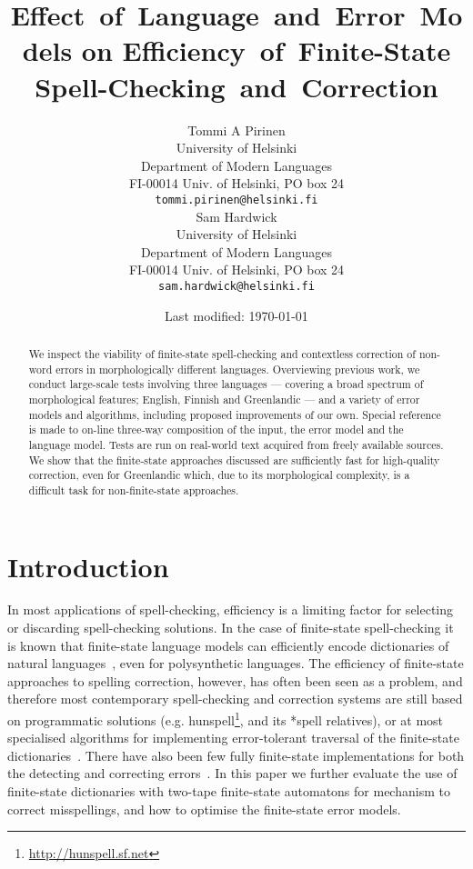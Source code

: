 \documentclass[free]{flammie}
\title{Effect~of~Language~and~Error~Models on Efficiency~of~Finite-State
Spell-Checking~and~Correction\footnotepubrights{Originally published in
FSMNLP 2012 in Donostia. Official version available from ACL anthology:
\url{http://aclweb.org/anthology//sigfsm.html}}}
\author{
Tommi A Pirinen\\
University of Helsinki\\
Department of Modern Languages\\
FI-00014 Univ. of Helsinki, PO box 24\\
{\tt tommi.pirinen@helsinki.fi} \\
Sam Hardwick\\
University of Helsinki\\
Department of Modern Languages\\
FI-00014 Univ. of Helsinki, PO box 24\\
{\tt sam.hardwick@helsinki.fi} \\
}
\date{Last modified: \today}
\begin{document}
\maketitle 

\begin{abstract} We inspect the viability of finite-state
spell-checking and contextless correction of non-word errors in morphologically
different languages. Overviewing previous
work, we conduct large-scale tests involving three languages
--- covering a broad spectrum of morphological features;
English, Finnish and Greenlandic --- and a variety of
error models and algorithms, including proposed
improvements of our own. Special reference is made to on-line
three-way composition of the input, the error model and the language model.
Tests are run on real-world text acquired from
freely available sources.
We show that the finite-state approaches discussed are sufficiently fast
for high-quality correction, even for Greenlandic which, due to its morphological
complexity, is a difficult task for non-finite-state approaches.
\end{abstract}

\section{Introduction}
\label{sec:introduction}

In most applications of spell-checking, efficiency is a limiting
factor for selecting or discarding spell-checking solutions. In the case of
finite-state spell-checking it is known that finite-state language models can
efficiently encode dictionaries of natural languages~\cite{beesley/2003}, even
for polysynthetic languages. The efficiency of finite-state approaches to
spelling correction, however, has often been seen as a problem, and therefore
most contemporary spell-checking and correction systems are still based on
programmatic solutions (e.g.  hunspell\footnote{\url{http://hunspell.sf.net}},
and its *spell relatives), or at most specialised algorithms for implementing
error-tolerant traversal of the finite-state
dictionaries~\cite{oflazer/1996,hulden/2009}. There have also been few fully
finite-state implementations for both the detecting and correcting
errors~\cite{schulz/2002,pirinen/2010/lrec}. In this paper we further evaluate
the use of finite-state dictionaries with two-tape finite-state automatons for
mechanism to correct misspellings, and how to optimise the finite-state error
models.
\end{document}

